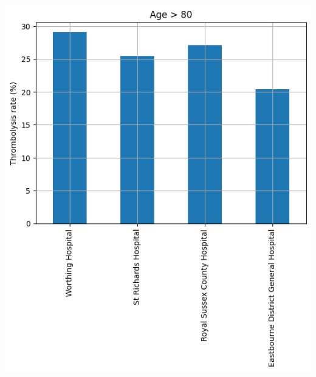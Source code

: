 \begin{frame}
\begin{columns}[T]
\begin{column}{0.5\textwidth}
      \includegraphics[width=1.0\textwidth]{./sussex/images/subgroup_age}
    \end{column}
  \end{columns}

\end{frame}


